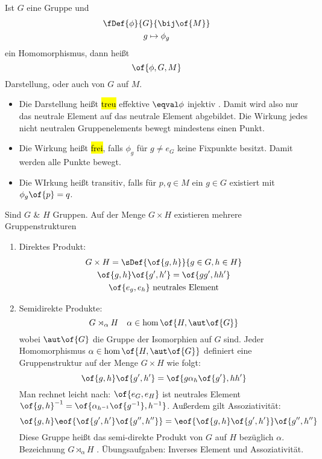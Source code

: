 Ist $G$ eine Gruppe und 
\begin{gather}
	\fDef{\phi}{G}{\bij\of{M}} \\
	g \mapsto \phi_g
\end{gather}
ein Homomorphismus, dann heißt
\begin{equation}
	\of{\phi,G,M}
\end{equation}
 Darstellung, oder auch  von $G$ auf $M$. 
\begin{itemize}
	\item Die Darstellung heißt \hl{treu} \bzw effektive  $\eqval \phi$ injektiv . Damit wird also nur das neutrale Element auf das neutrale Element abgebildet. Die Wirkung jedes nicht neutralen Gruppenelements bewegt mindestens einen Punkt.
	\item Die Wirkung heißt \hl{frei}, falls $\phi_g$ für $g \neq e_G$ keine Fixpunkte besitzt. Damit werden alle Punkte bewegt.
	\item Die WIrkung heißt  transitiv, falls für $p,q \in M$  ein $g\in G$ existiert mit $\phi_g\of{p} = q$.
\end{itemize}
Sind $G$ \& $H$ Gruppen. Auf der Menge $G\times H$ existieren mehrere Gruppenstrukturen
\begin{enumerate}
	\item Direktes Produkt:
	\begin{gather}
		G \times H = \sDef{\of{g,h}}{g\in G,h\in H} \\
		\of{g,h}\of{g',h'} = \of{gg',hh'} \\
		\of{e_g,e_h} \text{ neutrales Element}
	\end{gather}
	\item Semidirekte Produkte:
	\begin{equation}
		G \rtimes_\alpha H \quad \alpha \in \hom\of{H,\aut\of{G}}
	\end{equation}
	wobei $\aut\of{G}$ die Gruppe der Isomorphien auf $G$ sind. Jeder Homomorphismus $\alpha \in \hom\of{H,\aut\of{G}}$ definiert eine Gruppenstruktur auf der Menge $G\times H$ wie folgt:
	\begin{equation}
		\of{g,h}\of{g',h'} = \of{g\alpha_h\of{g'},hh'}
	\end{equation}
	Man rechnet leicht nach: $\of{e_G,e_H}$ ist neutrales Element $\of{g,h}^{-1} = \of{\alpha_{h^{-1}}\of{g^{-1}},h^{-1}}$. Außerdem gilt Assoziativität:
	\begin{equation}
		\of{g,h}\eof{\of{g',h'}\of{g'',h''}} = \eof{\of{g,h}\of{g',h'}}\of{g'',h''}
	\end{equation}
	Diese Gruppe heißt das semi-direkte Produkt von $G$ auf $H$ bezüglich $\alpha$. Bezeichnung $G \rtimes_{\alpha} H$ . Übungsaufgaben: Inverses Element und Assoziativität.
\end{enumerate}
